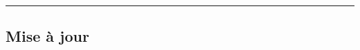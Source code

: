 \documentclass[a4paper,10pt]{article}
\begin{document}
    \begin{justify}

    \end{justify}




    \color{sec2}\par\noindent\rule{\textwidth}{0.4pt}\color{text}

    \color{sec2}
    \subsection{Mise à jour}\color{text}

    \begin{justify}

    \end{justify}
\end{document}
